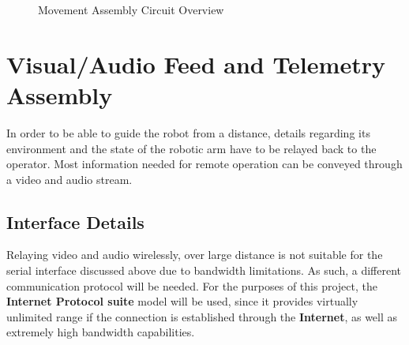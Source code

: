 \documentclass[12p,a4paper]{report}
\begin{document}
\begin{figure}[H]
\begin{center}
\caption{Movement Assembly Circuit Overview}
\label{fig:movement_diagram}
\end{center}
\end{figure}


\section{Visual/Audio Feed and Telemetry Assembly}
In order to be able to guide the robot from a distance, details regarding its environment and the state of the robotic arm have to be relayed back to the operator. Most information needed for remote operation can be conveyed through a video and audio stream.


\subsection{Interface Details}
Relaying video and audio wirelessly, over large distance is not suitable for the serial interface discussed above due to bandwidth limitations. As such, a different communication protocol will be needed. For the purposes of this project, the \textbf{Internet Protocol suite} model will be used, since it provides virtually unlimited range if the connection is established through the \textbf{Internet}, as well as extremely high bandwidth capabilities.
\end{document}
